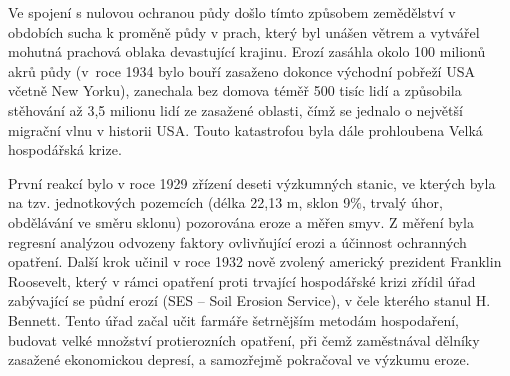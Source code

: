 Ve spojení s nulovou ochranou půdy došlo tímto způsobem zemědělství v
obdobích sucha k proměně půdy v prach, který byl unášen větrem a
vytvářel mohutná prachová oblaka devastující krajinu. Erozí zasáhla
okolo 100 milionů akrů půdy (v~roce 1934 bylo bouří zasaženo dokonce
východní pobřeží USA včetně New Yorku), zanechala bez domova téměř 500
tisíc lidí a způsobila stěhování až 3,5 milionu lidí ze zasažené
oblasti, čímž se jednalo o největší migrační vlnu v historii
USA. Touto katastrofou byla dále prohloubena Velká hospodářská krize.

První reakcí bylo v roce 1929 zřízení deseti výzkumných stanic, ve
kterých byla na tzv. jednotkových pozemcích (délka 22,13 m, sklon
9$\%$, trvalý úhor, obdělávání ve směru sklonu) pozorována eroze a
měřen smyv. Z měření byla regresní analýzou odvozeny faktory
ovlivňující erozi a účinnost ochranných opatření. Další krok učinil v
roce 1932 nově zvolený americký prezident Franklin Roosevelt, který v
rámci opatření proti trvající hospodářské krizi zřídil úřad zabývající
se půdní erozí (SES – Soil Erosion Service), v čele kterého stanul
H. Bennett. Tento úřad začal učit farmáře šetrnějším metodám
hospodaření, budovat velké množství protierozních opatření, při čemž
zaměstnával dělníky zasažené ekonomickou depresí, a samozřejmě
pokračoval ve výzkumu eroze.\cite{Bonnifield1979}\cite{Egan2006}

